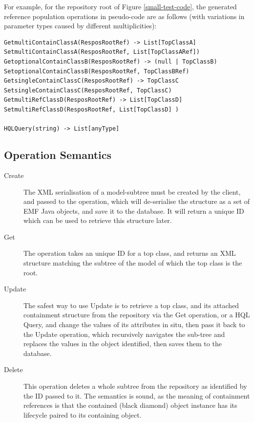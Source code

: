\documentclass[11pt]{article}
\providecommand{\DIFaddbegin}{} %
\providecommand{\DIFaddend}{} %
\providecommand{\DIFdelbegin}{} %
\providecommand{\DIFdelend}{} %
\begin{document}
For example, for the repository root of Figure \ref{small-test-code}, the generated reference population operations in pseudo-code are as follows (with variations in parameter types caused by different multiplicities):
\DIFdelbegin %
\DIFdelend \DIFaddbegin \begin{verbatim}
GetmultiContainClassA(ResposRootRef) -> List[TopClassA] 
SetmultiContainClassA(ResposRootRef, List[TopClassARef])
GetoptionalContainClassB(ResposRootRef) -> (null | TopClassB)
SetoptionalContainClassB(ResposRootRef, TopClassBRef)
GetsingleContainClassC(ResposRootRef) -> TopClassC
SetsingleContainClassC(ResposRootRef, TopClassC)
GetmultiRefClassD(ResposRootRef) -> List[TopClassD] 
SetmultiRefClassD(ResposRootRef, List[TopClassD] )

HQLQuery(string) -> List[anyType]
\end{verbatim}
\DIFaddend 


\subsection{Operation Semantics}

\begin{description}
\item[Create] The XML serialisation of a model-subtree must be created by the client, and passed to the operation, which will de-serialise the structure as a set of EMF Java objects, and save it to the database. It will return a unique ID which can be used to retrieve this structure later.
\item[Get] The operation takes an unique ID for a top class, and returns an XML structure matching the subtree of the model of which the top class is the root.
\item[Update] The safest way to use Update is to retrieve a top class, and its attached containment structure from the repository via the Get operation, or a HQL Query, and change the values of its attributes in situ, then pass it back to the Update operation, which recursively navigates the sub-tree and replaces the values in the object identified, then saves them to the database.
\item[Delete] This operation deletes a whole subtree from the repository as identified by the ID passed to it. The semantics is sound, as the meaning of containment references is that the contained (black diamond) object instance has its lifecycle paired to its containing object.
\end{description}
\DIFaddbegin 
\end{document}
